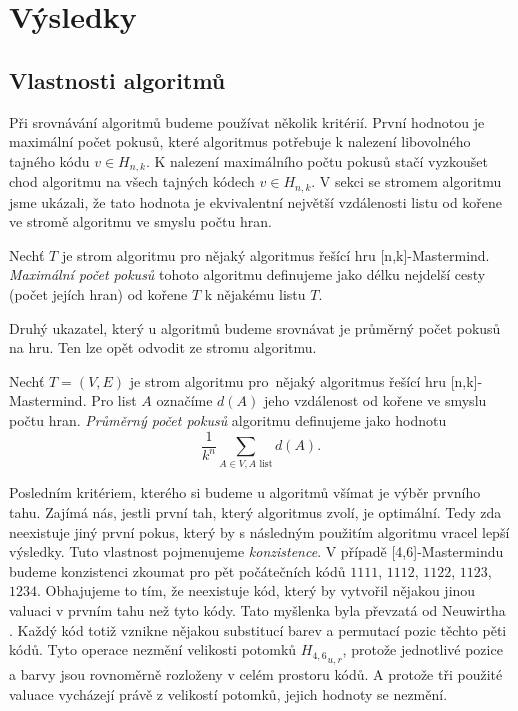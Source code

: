 \chapter{Výsledky}

\section{Vlastnosti algoritmů}
Při srovnávání algoritmů budeme používat několik kritérií. První hodnotou je maximální počet pokusů, které algoritmus potřebuje k nalezení libovolného tajného kódu $v \in H_{n,k}$. K nalezení maximálního počtu pokusů stačí vyzkoušet chod algoritmu na všech tajných kódech $v \in H_{n,k}$. V sekci se stromem algoritmu jsme ukázali, že tato hodnota je ekvivalentní největší vzdálenosti listu od kořene ve stromě algoritmu ve smyslu počtu hran.

\begin{definice}\label{defmaxpocetpokusu}
    Nechť $T$ je strom algoritmu pro nějaký algoritmus řešící hru [n,k]-Mastermind. \emph{Maximální počet pokusů} tohoto algoritmu definujeme jako délku nejdelší cesty (počet jejích hran) od kořene $T$ k nějakému listu $T$. 
\end{definice}

Druhý ukazatel, který u algoritmů budeme srovnávat je průměrný počet pokusů na hru. Ten lze opět odvodit ze stromu algoritmu.

\begin{definice}\label{defprumpocetpokusu}
    Nechť $T = (V,E)$ je strom algoritmu pro~nějaký algoritmus řešící hru [n,k]-Mastermind. Pro list $A$ označíme $d(A)$ jeho vzdálenost od kořene ve smyslu počtu hran. \emph{Průměrný počet pokusů} algoritmu definujeme jako hodnotu
    \[\frac{1}{k^n}\sum_{A\in V, A \text{ list}} d(A).\]
\end{definice}

Posledním kritériem, kterého si budeme u algoritmů všímat je výběr prvního tahu. Zajímá nás, jestli první tah, který algoritmus zvolí, je optimální. Tedy zda neexistuje jiný první pokus, který by s následným použitím algoritmu vracel lepší výsledky. Tuto vlastnost pojmenujeme \emph{konzistence}. V případě [4,6]-Mastermindu budeme konzistenci zkoumat pro pět počátečních kódů $1111$, $1112$, $1122$, $1123$, $1234$. Obhajujeme to tím, že neexistuje kód, který by vytvořil nějakou jinou valuaci v prvním tahu než tyto kódy. Tato myšlenka byla převzatá od Neuwirtha \cite{neuwirth}. Každý kód totiž vznikne nějakou substitucí barev a permutací pozic těchto pěti kódů. Tyto operace nezmění velikosti potomků ${H_{4,6}}_{u,r}$, protože jednotlivé pozice a barvy jsou rovnoměrně rozloženy v celém prostoru kódů. A protože tři použité valuace vycházejí právě z velikostí potomků, jejich hodnoty se nezmění. 

